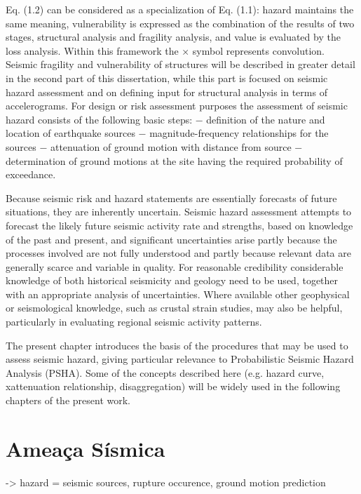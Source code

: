 Eq. (1.2) can be considered as a specialization of Eq. (1.1): hazard maintains the same meaning, vulnerability is
expressed as the combination of the results of two stages, structural analysis and fragility analysis, and value is
evaluated by the loss analysis. Within this framework the × symbol represents convolution.
Seismic fragility and vulnerability of structures will be described in greater detail in the second part of this
dissertation, while this part is focused on seismic hazard assessment and on defining input for structural analysis in
terms of accelerograms.
For design or risk assessment purposes the assessment of seismic hazard consists of the following basic steps:
− definition of the nature and location of earthquake sources
− magnitude-frequency relationships for the sources
− attenuation of ground motion with distance from source
− determination of ground motions at the site having the required probability
of exceedance.

Because seismic risk and hazard statements are essentially forecasts of future situations, they are inherently
uncertain. Seismic hazard assessment attempts to forecast the likely future seismic activity rate and strengths, based
on knowledge of the past and present, and significant uncertainties arise partly because the processes involved are not
fully understood and partly because relevant data are generally scarce and variable in quality. For reasonable
credibility considerable knowledge of both historical seismicity and geology need to be used, together with an 
appropriate analysis of uncertainties. Where available other geophysical or seismological knowledge, such as  crustal
strain studies, may also be helpful, particularly in evaluating regional seismic activity patterns.

The present chapter introduces the basis of the procedures that may be used to assess seismic hazard, giving particular
relevance to Probabilistic Seismic Hazard Analysis (PSHA). Some of the concepts described here (e.g. hazard curve,
xattenuation relationship, disaggregation) will be widely used in the following chapters of the present work.


\section{Ameaça Sísmica}
\label{sec:ameaca_sismica}

-> hazard = seismic sources, 
			rupture occurence, 
			ground motion prediction 

